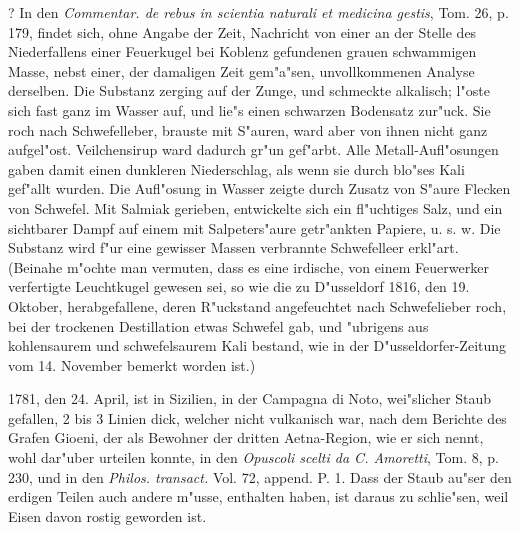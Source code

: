 \documentclass[a4paper, 11pt, oneside, polutonikogreek, german]{article}
\begin{document}
? In den \emph{Commentar. de rebus in scientia naturali et medicina gestis}, Tom. 26, p. 179, findet sich, ohne Angabe der Zeit, Nachricht von einer an der Stelle des Niederfallens einer Feuerkugel bei Koblenz gefundenen grauen schwammigen Masse, nebst einer, der damaligen Zeit gem"a"sen, unvollkommenen Analyse derselben. Die Substanz zerging auf der Zunge, und schmeckte alkalisch; l"oste sich fast ganz im Wasser auf, und lie"s einen schwarzen Bodensatz zur"uck. Sie roch nach Schwefelleber, brauste mit S"auren, ward aber von ihnen nicht ganz aufgel"ost. Veilchensirup ward dadurch gr"un gef"arbt. Alle Metall-Aufl"osungen gaben damit einen dunkleren Niederschlag, als wenn sie durch blo"ses Kali gef"allt wurden. Die Aufl"osung in Wasser zeigte durch Zusatz von S"aure Flecken von Schwefel. Mit Salmiak gerieben, entwickelte sich ein fl"uchtiges Salz, und ein sichtbarer Dampf auf einem mit Salpeters"aure getr"ankten Papiere, u. s. w. Die Substanz wird f"ur eine gewisser Massen verbrannte Schwefelleer erkl"art. (Beinahe m"ochte man vermuten, dass es eine irdische, von einem Feuerwerker verfertigte Leuchtkugel gewesen sei, so wie die zu D"usseldorf 1816, den 19. Oktober, herabgefallene, deren R"uckstand angefeuchtet nach Schwefelieber roch, bei der trockenen Destillation etwas Schwefel gab, und "ubrigens aus kohlensaurem und schwefelsaurem Kali bestand, wie in der D"usseldorfer-Zeitung vom 14. November bemerkt worden ist.)

1781, den 24. April, ist in Sizilien, in der Campagna di Noto, wei"slicher Staub gefallen, 2 bis 3 Linien dick, welcher nicht vulkanisch war, nach dem Berichte des Grafen Gioeni, der als Bewohner der dritten Aetna-Region, wie er sich nennt, wohl dar"uber urteilen konnte, in den \emph{Opuscoli scelti da C. Amoretti}, Tom. 8, p. 230, und in den \emph{Philos. transact.} Vol. 72, append. P. 1. Dass der Staub au"ser den erdigen Teilen auch andere m"usse, enthalten haben, ist daraus zu schlie"sen, weil Eisen davon rostig geworden ist.
\end{document}
